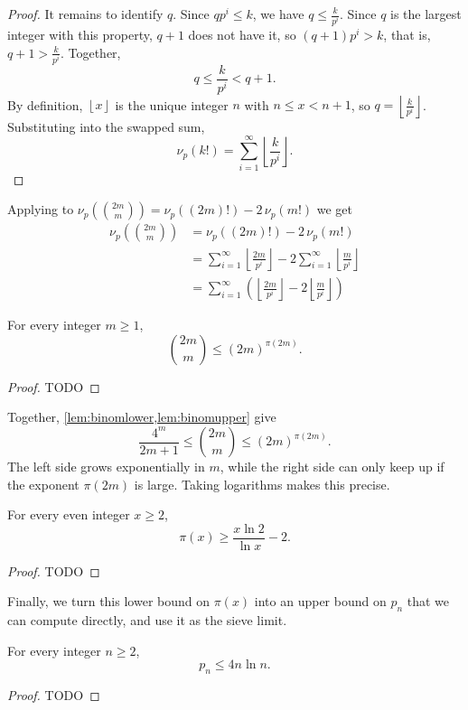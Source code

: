 \documentclass{article}
\begin{document}
\begin{proof}
  It remains to identify $q$. Since $q p^i \le k$, we have $q \le \frac{k}{p^i}$. Since $q$ is the largest integer with
  this property, $q + 1$ does not have it, so $(q+1) p^i > k$, that is, $q + 1 > \frac{k}{p^i}$. Together,
  \[
    q \le \frac{k}{p^i} < q + 1.
  \]
  By definition, $\left\lfloor x \right\rfloor$ is the unique integer $n$ with $n \le x < n + 1$, so
  $q = \left\lfloor \frac{k}{p^i} \right\rfloor$. Substituting into the swapped sum,
  \[
    \nu_p(k!) = \sum_{i=1}^{\infty} \left\lfloor \frac{k}{p^i} \right\rfloor.
  \]
\end{proof}

Applying  to $ \nu_p\!\left(\binom{2m}{m}\right) = \nu_p((2m)!) - 2\,\nu_p(m!)$ we get
\[
\begin{aligned}
  \nu_p\!\left(\binom{2m}{m}\right) &= \nu_p((2m)!) - 2\,\nu_p(m!) \\
  &= \sum_{i=1}^{\infty} \left\lfloor \frac{2m}{p^i} \right\rfloor - 2 \sum_{i=1}^{\infty} \left\lfloor \frac{m}{p^i} \right\rfloor \\
  &= \sum_{i=1}^{\infty} \left( \left\lfloor \frac{2m}{p^i} \right\rfloor - 2 \left\lfloor \frac{m}{p^i} \right\rfloor \right)
\end{aligned}
\]

\begin{lemma}\label{lem:binomupper}
  For every integer $m \ge 1$,
  \[
    \binom{2m}{m} \le {(2m)}^{\pi(2m)}.
  \]
\end{lemma}
\begin{proof}
  TODO
\end{proof}

Together, \cref{lem:binomlower,lem:binomupper} give
\[
  \frac{4^m}{2m+1} \le \binom{2m}{m} \le {(2m)}^{\pi(2m)}.
\]
The left side grows exponentially in $m$, while the right side can only keep up if the exponent $\pi(2m)$ is large.
Taking logarithms makes this precise.

\begin{theorem}\label{thm:pilower}
  For every even integer $x \ge 2$,
  \[
    \pi(x) \ge \frac{x \ln 2}{\ln x} - 2.
  \]
\end{theorem}
\begin{proof}
  TODO
\end{proof}

Finally, we turn this lower bound on $\pi(x)$ into an upper bound on $p_n$ that we can compute directly, and use it as
the sieve limit.

\begin{theorem}\label{thm:pnupper}
  For every integer $n \ge 2$,
  \[
    p_n \le 4 n \ln n.
  \]
\end{theorem}
\begin{proof}
  TODO
\end{proof}
\end{document}
